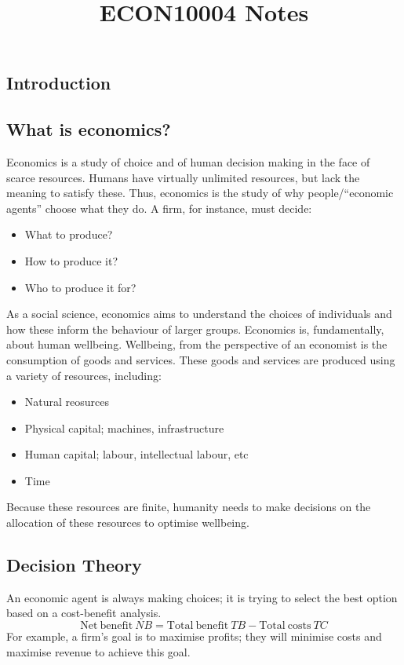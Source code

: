 \documentclass[12pt]{report}
\begin{document}
\begin{flushleft}

\title{ECON10004 Notes}
\chapter*{Introduction}

\section*{What is economics?}
Economics is a study of choice and of human decision making in the face of scarce resources.
Humans have virtually unlimited resources, but lack the meaning to satisfy these.
Thus, economics is the study of why people/``economic agents'' choose what they do.
A firm, for instance, must decide:
\begin{itemize}
    \item What to produce?
    \item How to produce it?
    \item Who to produce it for?
\end{itemize}
As a social science, economics aims to understand the choices of individuals and how these inform the behaviour of larger groups.
Economics is, fundamentally, about human wellbeing. Wellbeing, from the perspective of an economist is the consumption
of goods and services. These goods and services are produced using a variety of resources, including:
\begin{itemize}
    \item Natural reosurces 
    \item Physical capital; machines, infrastructure
    \item Human capital; labour, intellectual labour, etc
    \item Time
\end{itemize}
Because these resources are finite, humanity needs to make decisions on the allocation of these resources to optimise wellbeing.

\section*{Decision Theory}
An economic agent is always making choices; it is trying to select the best option based on a 
cost-benefit analysis. 
\[\mathrm{Net\:benefit}\:NB = \mathrm{Total\:benefit}\:TB - \mathrm{Total\:costs}\:TC\]
For example, a firm's goal is to maximise profits; they will minimise costs and maximise revenue to achieve this goal.


\end{flushleft}
\end{document}
